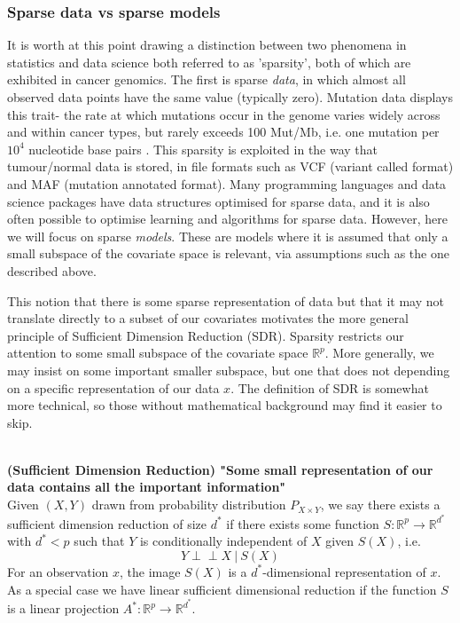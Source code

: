 \documentclass[thesis.tex]{subfiles}
\begin{document}
\subsubsection{Sparse data vs sparse models}
It is worth at this point drawing a distinction between two phenomena in statistics and data science both referred to as 'sparsity', both of which are exhibited in cancer genomics. The first is sparse \textit{data}, in which almost all observed data points have the same value (typically zero). Mutation data displays this trait- the rate at which mutations occur in the genome varies widely across and within cancer types, but rarely exceeds 100 Mut/Mb, i.e. one mutation per $10^4$ nucleotide base pairs \citep{chalmers_analysis_2017}. This sparsity is exploited in the way that tumour/normal  data is stored, in file formats such as VCF (variant called format) and MAF (mutation annotated format). Many programming languages and data science packages have data structures optimised for sparse data, and it is also often possible to optimise learning and algorithms for sparse data. However, here we will focus on sparse \textit{models}. These are models where it is assumed that only a small subspace of the covariate space is relevant, via assumptions such as the one described above. 

This notion that there is some sparse representation of data but that it may not translate directly to a subset of our covariates motivates the more general principle of Sufficient Dimension Reduction (SDR). Sparsity restricts our attention to some small subspace of the covariate space $\mathbb{R}^p$. More generally, we may insist on some important smaller subspace, but one that does not depending on a specific representation of our data $x$. The definition of SDR is somewhat more technical, so those without mathematical background may find it easier to skip.\\~\\

\begin{definition}{\textbf{(Sufficient Dimension Reduction) "Some small representation of our data contains all the important information"}} \\
Given $(X,Y)$ drawn from probability distribution $P_{X\times Y}$, we say there exists a sufficient dimension reduction of size $d^*$ if there exists some function $S: \mathbb{R}^p \rightarrow \mathbb{R}^{d^*}$  with $d^* < p$ such that $Y$ is conditionally independent of $X$ given $S(X)$, i.e.
$$ Y \perp\!\!\!\perp X \ | \ S(X) $$
For an observation $x$, the image $S(X)$ is a $d^*$-dimensional representation of $x$. As a special case we have linear sufficient dimensional reduction if the function $S$ is a linear projection $A^*:\mathbb{R}^p\rightarrow \mathbb{R}^{d^*}$.
\end{definition}
\end{document}
